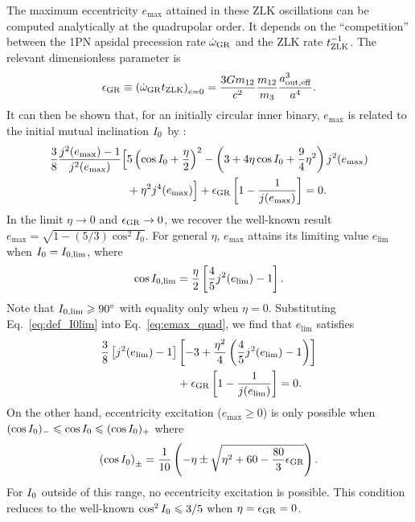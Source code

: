 \documentclass[
        fleqn,
        usenatbib,
    ]{mnras}
\newcommand*{\p}[1]{\left(#1\right)}
\newcommand*{\s}[1]{\left[#1\right]}
\begin{document}
The maximum eccentricity $e_{\max}$ attained in these ZLK oscillations can be
computed analytically at the quadrupolar order. It depends on the
``competition'' between the 1PN apsidal precession rate $\dot{\omega}_{\rm GR}$
and the ZLK rate $t_{\rm ZLK}^{-1}$. The relevant dimensionless parameter is
\begin{align}
    \epsilon_{\rm GR} \equiv \p{\dot{\omega}_{\rm GR} t_{\rm ZLK}}_{e = 0}
        = \frac{3Gm_{12}}{c^2} \frac{m_{12}}{m_3}\frac{a_{\rm out, eff}^3}{a^4}.
\end{align}
It can then be shown that, for an initially circular inner binary, $e_{\max}$ is
related to the initial mutual inclination $I_{\rm 0}$ by \citep{LML15,
anderson2016formation}:
\begin{align}
    \frac{3}{8}\frac{j^2(e_{\max}) - 1}{j^2(e_{\max})}\Big[&
        5\p{\cos I_0 + \frac{\eta}{2}}^2
        - \p{3 + 4\eta \cos I_0 + \frac{9}{4}\eta^2}j^2(e_{\max})
            \nonumber\\
        &+ \eta^2 j^4(e_{\max})
    \Big] + \epsilon_{\rm GR}\s{1 - \frac{1}{j(e_{\max})}} = 0.
    \label{eq:emax_quad}
\end{align}
In the limit $\eta \to 0$ and $\epsilon_{\rm GR} \to 0$, we recover the
well-known result $e_{\max} = \sqrt{1 - (5/3) \cos^2 I_0}$. For general $\eta$,
$e_{\max}$ attains its limiting value $e_{\lim}$ when $I_{\rm 0} = I_{\rm 0,
\lim}$, where
\begin{align}
    \cos I_{\rm 0, \lim} = \frac{\eta}{2}\s{\frac{4}{5}j^2(e_{\lim}) -
        1}.\label{eq:def_I0lim}
\end{align}
Note that $I_{\rm 0, \lim} \geq 90^\circ$ with equality only when $\eta
= 0$. Substituting Eq.~\eqref{eq:def_I0lim} into Eq.~\eqref{eq:emax_quad}, we find
that $e_{\lim}$ satisfies
\begin{align}
    \frac{3}{8}\s{j^2(e_{\lim}) - 1}&\s{-3 + \frac{\eta^2}{4}
        \p{\frac{4}{5}j^2(e_{\lim}) - 1}}\nonumber\\
        &+ \epsilon_{\rm GR}\s{1 - \frac{1}{j(e_{\lim})}} = 0.
        \label{eq:def_elim}
\end{align}
On the other hand, eccentricity excitation ($e_{\max} \geq 0$) is only possible
when $(\cos I_{\rm 0})_- \leq \cos I_{\rm 0} \leq (\cos I_{\rm 0})_+$ where
\begin{align}
    \p{\cos I_{\rm 0}}_{\pm} = \frac{1}{10}\p{-\eta \pm \sqrt{\eta^2 + 60 -
        \frac{80}{3}\epsilon_{\rm GR}}}.\label{eq:I0bounds}
\end{align}
For $I_{\rm 0}$ outside of this range, no eccentricity excitation is possible.
This condition reduces to the well-known $\cos^2 I_{\rm 0} \leq 3/5$ when $\eta
= \epsilon_{\rm GR} = 0$.
\end{document}
